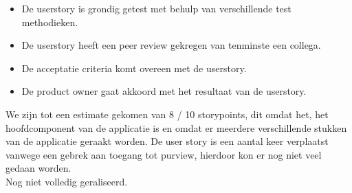\documentclass{article}
\begin{document}
    {
        \begin{itemize}
            \item De userstory is grondig getest met behulp van verschillende test\\ methodieken.
            \item De userstory heeft een peer review gekregen van tenminste een collega.
            \item De acceptatie criteria komt overeen met de userstory.
            \item De product owner gaat akkoord met het resultaat van de userstory.
        \end{itemize}
    }
    {
        We zijn tot een estimate gekomen van 8 / 10 storypoints, 
        dit omdat het, het hoofdcomponent van de applicatie is en omdat er meerdere verschillende stukken van de applicatie geraakt worden.
    }
    {
        De user story is een aantal keer verplaatst vanwege een gebrek aan toegang tot purview,
        hierdoor kon er nog niet veel gedaan worden. \\ \newline
        Nog niet volledig geraliseerd.
    }
\end{document}
